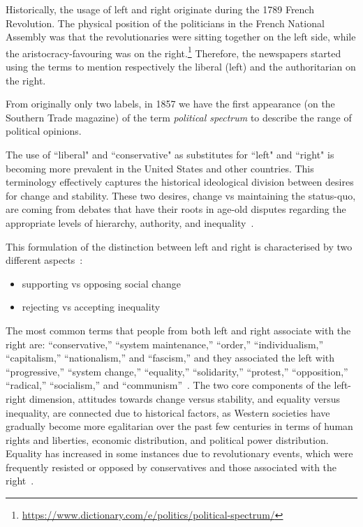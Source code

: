 
Historically, the usage of left and right originate during the 1789 French Revolution. The physical position of the politicians in the French National Assembly was that the revolutionaries were sitting together on the left side, while the aristocracy-favouring was on the right.\footnote{\url{https://www.dictionary.com/e/politics/political-spectrum/}}
Therefore, the newspapers started using the terms to mention respectively the liberal (left) and the authoritarian on the right.

From originally only two labels, in 1857 we have the first appearance (on the Southern Trade magazine) of the term \emph{political spectrum} to describe the range of political opinions.


The use of ``liberal" and ``conservative" as substitutes for ``left" and ``right" is becoming more prevalent in the United States and other countries.
This terminology effectively captures the historical ideological division between desires for change and stability.
These two desires, change vs maintaining the status-quo, are coming from debates that have their roots in age-old disputes regarding the appropriate levels of hierarchy, authority, and inequality~\citep{bobbio1996left}.


This formulation of the distinction between left and right is characterised by
two different aspects~\citep{jost2018political}:
\begin{itemize}
    \item supporting vs opposing social change
    \item rejecting vs accepting inequality
\end{itemize}
The most common terms that people from both left and right associate with the right are: “conservative,” “system maintenance,” “order,” “individualism,” “capitalism,” “nationalism,” and “fascism,” and they associated the left with “progressive,” “system change,” “equality,” “solidarity,” “protest,” “opposition,” “radical,” “socialism,” and “communism”~\citep[p.~213-14]{fuchs1990}.
The two core components of the left-right dimension, attitudes towards change versus stability, and equality versus inequality, are connected due to historical factors, as Western societies have gradually become more egalitarian over the past few centuries in terms of human rights and liberties, economic distribution, and political power distribution.
Equality has increased in some instances due to revolutionary events, which were frequently resisted or opposed by conservatives and those associated with the right~\cite{nosek2009politics,burke1790reflections}.



